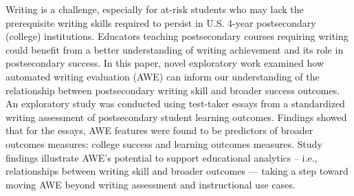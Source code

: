 Writing is a challenge, especially for at-risk students who may lack the prerequisite writing skills required to persist in U.S. 4-year postsecondary (college) institutions. Educators teaching postsecondary courses requiring writing could benefit from a better understanding of writing achievement and its role in postsecondary success. In this paper, novel exploratory work examined how automated writing evaluation (AWE) can inform our understanding of the relationship between postsecondary writing skill and broader success outcomes. An exploratory study was conducted using test-taker essays from a standardized writing assessment of postsecondary student learning outcomes. Findings showed that for the essays, AWE features were found to be predictors of broader outcomes measures: college success and learning outcomes measures. Study findings illustrate AWE's potential to support educational analytics -- i.e., relationships between writing skill and broader outcomes --- taking a step toward moving AWE beyond writing assessment and instructional use cases.
